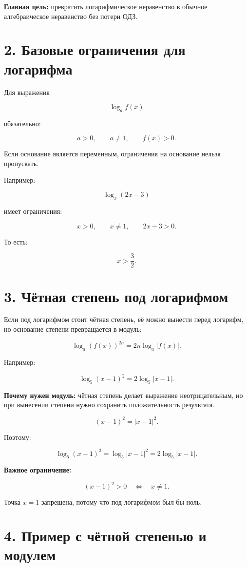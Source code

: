 \documentclass[a4paper,12pt]{article}
\begin{document}
\textbf{Главная цель:} превратить логарифмическое неравенство в обычное алгебраическое неравенство без потери ОДЗ.

\section*{2. Базовые ограничения для логарифма}

Для выражения

\[
\log_a f(x)
\]

обязательно:

\[
a>0,
\qquad
a\ne1,
\qquad
f(x)>0.
\]

Если основание является переменным, ограничения на основание нельзя пропускать.

Например:

\[
\log_x(2x-3)
\]

имеет ограничения:

\[
x>0,
\qquad
x\ne1,
\qquad
2x-3>0.
\]

То есть:

\[
x>\frac32.
\]

\section*{3. Чётная степень под логарифмом}

Если под логарифмом стоит чётная степень, её можно вынести перед логарифм, но основание степени превращается в модуль:

\[
\log_a\left(f(x)\right)^{2n}
=
2n\log_a|f(x)|.
\]

Например:

\[
\log_5(x-1)^2=2\log_5|x-1|.
\]

\textbf{Почему нужен модуль:} чётная степень делает выражение неотрицательным, но при вынесении степени нужно сохранить положительность результата.

\[
(x-1)^2=\bigl|x-1\bigr|^2.
\]

Поэтому:

\[
\log_5(x-1)^2
=
\log_5|x-1|^2
=
2\log_5|x-1|.
\]

\textbf{Важное ограничение:}

\[
(x-1)^2>0
\quad\Longleftrightarrow\quad
x\ne1.
\]

Точка \(x=1\) запрещена, потому что под логарифмом был бы ноль.

\section*{4. Пример с чётной степенью и модулем}
\end{document}
